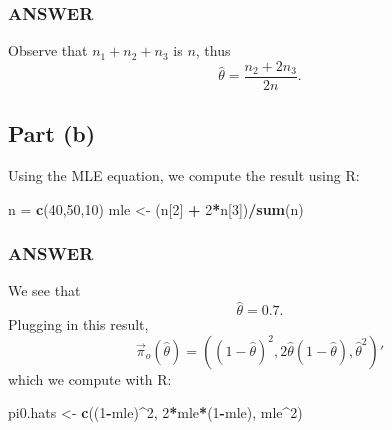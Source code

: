 \documentclass[
]{article}
\newenvironment{Shaded}{\begin{snugshade}}{\end{snugshade}}
\newcommand{\DecValTok}[1]{\textcolor[rgb]{0.00,0.00,0.81}{#1}}
\newcommand{\FunctionTok}[1]{\textcolor[rgb]{0.13,0.29,0.53}{\textbf{#1}}}
\newcommand{\NormalTok}[1]{#1}
\newcommand{\OtherTok}[1]{\textcolor[rgb]{0.56,0.35,0.01}{#1}}
\newcommand{\SpecialCharTok}[1]{\textcolor[rgb]{0.81,0.36,0.00}{\textbf{#1}}}
\begin{document}
\hypertarget{answer-17}{%
\subsubsection{ANSWER}\label{answer-17}}

Observe that \(n_1 + n_2 + n_3\) is \(n\), thus \[
  \hat\theta = \frac{n_2 + 2 n_3}{2 n}.
\]

\hypertarget{part-b-3}{%
\subsection{Part (b)}\label{part-b-3}}


Using the MLE equation, we compute the result using R:

\begin{Shaded}
\begin{Highlighting}[]
\NormalTok{n }\OtherTok{=} \FunctionTok{c}\NormalTok{(}\DecValTok{40}\NormalTok{,}\DecValTok{50}\NormalTok{,}\DecValTok{10}\NormalTok{)}
\NormalTok{mle }\OtherTok{\textless{}{-}}\NormalTok{ (n[}\DecValTok{2}\NormalTok{] }\SpecialCharTok{+} \DecValTok{2}\SpecialCharTok{*}\NormalTok{n[}\DecValTok{3}\NormalTok{])}\SpecialCharTok{/}\FunctionTok{sum}\NormalTok{(n)}
\end{Highlighting}
\end{Shaded}

\hypertarget{answer-18}{%
\subsubsection{ANSWER}\label{answer-18}}

We see that \[
  \hat\theta = 0.7.
\] Plugging in this result, \[
  \vec{\pi}_{o}(\hat\theta) = (
    (1-\hat\theta)^2,
    2\hat\theta(1-\hat\theta),
    \hat\theta^2)'
\] which we compute with R:

\begin{Shaded}
\begin{Highlighting}[]
\NormalTok{pi0.hats }\OtherTok{\textless{}{-}} \FunctionTok{c}\NormalTok{((}\DecValTok{1}\SpecialCharTok{{-}}\NormalTok{mle)}\SpecialCharTok{\^{}}\DecValTok{2}\NormalTok{,}
            \DecValTok{2}\SpecialCharTok{*}\NormalTok{mle}\SpecialCharTok{*}\NormalTok{(}\DecValTok{1}\SpecialCharTok{{-}}\NormalTok{mle),}
\NormalTok{            mle}\SpecialCharTok{\^{}}\DecValTok{2}\NormalTok{)}
\end{Highlighting}
\end{Shaded}
\end{document}
